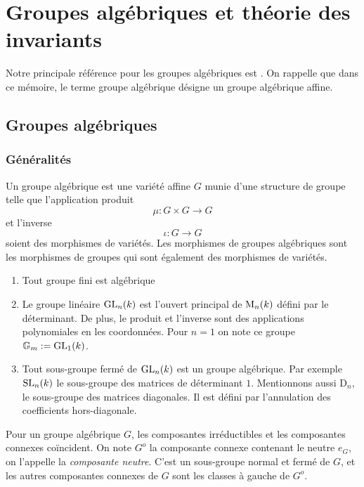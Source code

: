 \chapter{Groupes algébriques et théorie des invariants}

Notre principale référence pour les groupes algébriques est \cite{LAGSpringer}. On rappelle que dans ce mémoire, le terme groupe algébrique désigne un groupe algébrique affine.

\section{Groupes algébriques}

\subsection{Généralités}

\begin{defn}
Un groupe algébrique est une variété affine $G$ munie d'une structure de groupe telle que l'application produit
$$\mu:G\times G\rightarrow G$$
et l'inverse
$$\iota:G\rightarrow G$$
soient des morphismes de variétés. Les morphismes de groupes algébriques sont les morphismes de groupes  qui sont également des morphismes de variétés.
\end{defn}

\begin{ex}
\begin{enumerate}
\item Tout groupe fini est algébrique
\item Le groupe linéaire $\operatorname{GL}_n(k)$ est l'ouvert principal de $\operatorname{M}_n(k)$ défini par le déterminant. De plus, le produit et l'inverse sont des applications polynomiales en les coordonnées. Pour $n=1$ on note ce groupe $\mathbb{G}_m:=\operatorname{GL}_1(k)$.
\item Tout sous-groupe fermé de $\operatorname{GL}_n(k)$ est un groupe algébrique. Par exemple $\operatorname{SL}_n(k)$ le sous-groupe des matrices de déterminant $1$. Mentionnons aussi D$_n$, le sous-groupe des matrices diagonales. Il est défini par l'annulation des coefficients hors-diagonale.
\end{enumerate}
\end{ex}

Pour un groupe algébrique $G$, les composantes irréductibles et les composantes connexes coïncident. On note $G^o$ la composante connexe contenant le neutre $e_G$, on l'appelle la \textit{composante neutre}. C'est un sous-groupe normal et fermé de $G$, et les autres composantes connexes de $G$ sont les classes à gauche de $G^o$.

